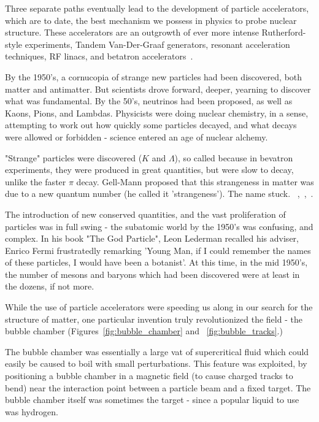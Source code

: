 Three separate paths eventually lead to the development of particle
accelerators, which are to date, the best mechanism we possess in physics to
probe nuclear structure. These accelerators are an outgrowth
of ever more intense Rutherford-style experiments, Tandem Van-Der-Graaf
generators, resonant acceleration techniques, RF linacs, and betatron
accelerators~\cite{Bryant1994}.

By the 1950's, a cornucopia of strange new particles had been discovered, both
matter and antimatter. But scientists drove forward, deeper, yearning to
discover what was fundamental. By the 50's, neutrinos had been proposed, as well
as Kaons, Pions, and Lambdas. Physicists were doing nuclear chemistry, in a
sense, attempting to work out how quickly some particles decayed, and what
decays were allowed or forbidden - science entered an age of nuclear alchemy.

"Strange" particles were discovered ($K$ and $\Lambda$), so called because in
bevatron experiments, they were produced in great quantities, but were slow to
decay, unlike the faster $\pi$ decay. Gell-Mann proposed that this strangeness
in matter was due to a new quantum number (he called it 'strangeness'). The name
stuck.
~\cite{Gell-Mann1953},~\cite{Gell-Mann1956},~\cite{KraussParticleHistory}.

The introduction of new conserved quantities, and the vast proliferation of
particles was in full swing - the subatomic world by the 1950's was confusing,
and complex. In his book "The God Particle", Leon Lederman recalled his adviser,
Enrico Fermi frustratedly remarking 'Young Man, if I could remember the names of
these particles, I would have been a botanist'. At this time, in the mid 1950's,
the number of mesons and baryons which had been discovered were at least in the
dozens, if not more.

While the use of particle accelerators were speeding us along in  our search for
the structure of matter, one particular invention truly revolutionized the
field - the bubble chamber (Figures~\ref{fig:bubble_chamber} and
~\ref{fig:bubble_tracks}.)

The bubble chamber was essentially a large vat of supercritical fluid which
could easily be caused to boil with small perturbations. This feature was
exploited, by positioning a bubble chamber in a magnetic field (to cause charged
tracks to bend) near the interaction point between a particle beam and a fixed
target. The bubble chamber itself was sometimes the target - since a popular
liquid to use was hydrogen. 

